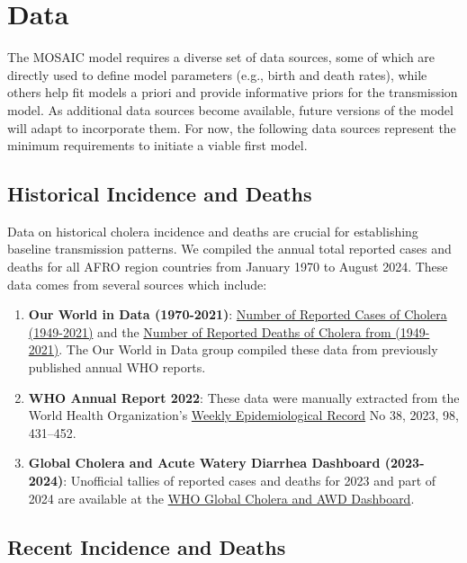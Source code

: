 \documentclass[
]{book}
\providecommand{\tightlist}{%
  \setlength{\itemsep}{0pt}\setlength{\parskip}{0pt}}
\begin{document}
\chapter{Data}\label{data}

The MOSAIC model requires a diverse set of data sources, some of which are directly used to define model parameters (e.g., birth and death rates), while others help fit models a priori and provide informative priors for the transmission model. As additional data sources become available, future versions of the model will adapt to incorporate them. For now, the following data sources represent the minimum requirements to initiate a viable first model.

\section{Historical Incidence and Deaths}\label{historical-incidence-and-deaths}

Data on historical cholera incidence and deaths are crucial for establishing baseline transmission patterns. We compiled the annual total reported cases and deaths for all AFRO region countries from January 1970 to August 2024. These data comes from several sources which include:

\begin{enumerate}
\def\labelenumi{\arabic{enumi}.}
\tightlist
\item
  \textbf{Our World in Data (1970-2021)}: \href{https://ourworldindata.org/grapher/number-reported-cases-of-cholera}{Number of Reported Cases of Cholera (1949-2021)} and the \href{https://ourworldindata.org/grapher/number-of-reported-cholera-deaths}{Number of Reported Deaths of Cholera from (1949-2021)}. The Our World in Data group compiled these data from previously published annual WHO reports.
\item
  \textbf{WHO Annual Report 2022}: These data were manually extracted from the World Health Organization's \href{https://www.who.int/publications/journals/weekly-epidemiological-record}{Weekly Epidemiological Record} No 38, 2023, 98, 431--452.
\item
  \textbf{Global Cholera and Acute Watery Diarrhea Dashboard (2023-2024)}: Unofficial tallies of reported cases and deaths for 2023 and part of 2024 are available at the \href{https://who-global-cholera-and-awd-dashboard-1-who.hub.arcgis.com/}{WHO Global Cholera and AWD Dashboard}.
\end{enumerate}

\section{Recent Incidence and Deaths}\label{recent-incidence-and-deaths}
\end{document}
